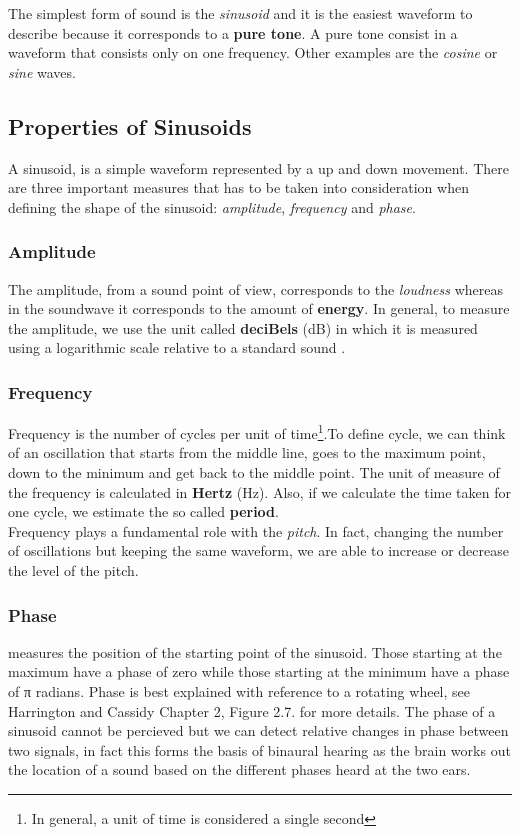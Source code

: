 \noindent The simplest form of sound is the \textit{sinusoid} and it is the easiest waveform to describe because it corresponds to a \textbf{pure tone}. A pure tone consist in a waveform that consists only on one frequency. Other examples are the \textit{cosine} or \textit{sine} waves.

\subsection{Properties of Sinusoids}
\label{sub:prop_of_sinusoids}
A sinusoid, is a simple waveform represented by a up and down movement. There are three important measures that has to be taken into consideration when defining the shape of the sinusoid: \textit{amplitude}, \textit{frequency} and \textit{phase}. 

\subsubsection{Amplitude}
The amplitude, from a sound point of view, corresponds to the \textit{loudness} whereas in the soundwave it corresponds to the amount of \textbf{energy}. In general, to measure the amplitude, we use the unit called \textbf{deciBels} (dB) in which it is measured using a logarithmic scale relative to a standard sound \cite{prop_of_sinusoids}.

\subsubsection{Frequency}
Frequency is the number of cycles per unit of time\footnote{In general, a unit of time is considered a single second}.To define cycle, we can think of an oscillation that starts from the middle line, goes to the maximum point, down to the minimum and get back to the middle point. The unit of measure of the frequency is calculated in \textbf{Hertz} (Hz). Also, if we calculate the time taken for one cycle, we estimate the so called \textbf{period}. \\ 
\noindent Frequency plays a fundamental role with the \textit{pitch}. In fact, changing the number of oscillations but keeping the same waveform, we are able to increase or decrease the level of the pitch.

\subsubsection{Phase}

measures the position of the starting point of the sinusoid. Those starting at the maximum have a phase of zero while those starting at the minimum have a phase of π radians. Phase is best explained with reference to a rotating wheel, see Harrington and Cassidy Chapter 2, Figure 2.7. for more details. The phase of a sinusoid cannot be percieved but we can detect relative changes in phase between two signals, in fact this forms the basis of binaural hearing as the brain works out the location of a sound based on the different phases heard at the two ears.


